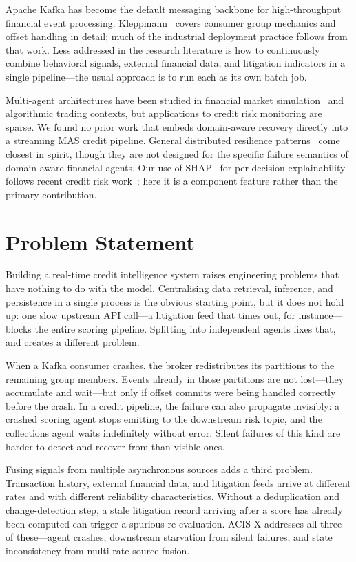 \documentclass[runningheads]{llncs}
\begin{document}
Apache Kafka has become the default messaging backbone for high-throughput financial event processing. Kleppmann~\cite{kleppmann2017designing} covers consumer group mechanics and offset handling in detail; much of the industrial deployment practice follows from that work. Less addressed in the research literature is how to continuously combine behavioral signals, external financial data, and litigation indicators in a single pipeline---the usual approach is to run each as its own batch job.

Multi-agent architectures have been studied in financial market simulation~\cite{tesfatsion2006handbook} and algorithmic trading contexts, but applications to credit risk monitoring are sparse. We found no prior work that embeds domain-aware recovery directly into a streaming MAS credit pipeline. General distributed resilience patterns~\cite{tanenbaum2023distributed} come closest in spirit, though they are not designed for the specific failure semantics of domain-aware financial agents. Our use of SHAP~\cite{lundberg2017unified} for per-decision explainability follows recent credit risk work~\cite{wang2023explainable}; here it is a component feature rather than the primary contribution.

\section{Problem Statement}

Building a real-time credit intelligence system raises engineering problems that have nothing to do with the model. Centralising data retrieval, inference, and persistence in a single process is the obvious starting point, but it does not hold up: one slow upstream API call---a litigation feed that times out, for instance---blocks the entire scoring pipeline. Splitting into independent agents fixes that, and creates a different problem.

When a Kafka consumer crashes, the broker redistributes its partitions to the remaining group members. Events already in those partitions are not lost---they accumulate and wait---but only if offset commits were being handled correctly before the crash. In a credit pipeline, the failure can also propagate invisibly: a crashed scoring agent stops emitting to the downstream risk topic, and the collections agent waits indefinitely without error. Silent failures of this kind are harder to detect and recover from than visible ones.

Fusing signals from multiple asynchronous sources adds a third problem. Transaction history, external financial data, and litigation feeds arrive at different rates and with different reliability characteristics. Without a deduplication and change-detection step, a stale litigation record arriving after a score has already been computed can trigger a spurious re-evaluation. ACIS-X addresses all three of these---agent crashes, downstream starvation from silent failures, and state inconsistency from multi-rate source fusion.
\end{document}
